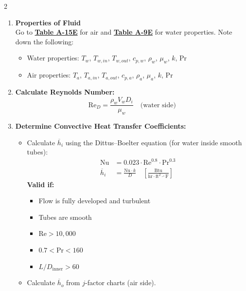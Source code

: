 \begin{multicols*}{2}
\begin{enumerate}
        \item \textbf{Properties of Fluid} \\
              Go to \underline{\textbf{Table A-15E}} for air and \underline{\textbf{Table A-9E}} for water properties. Note down the following:
              \begin{itemize}
                  \item Water properties: $T_w$, $T_{w,in}$, $T_{w,out}$, $c_{p,w}$, $\rho_w$, $\mu_w$, $k$, Pr
                  \item Air properties: $T_a$, $T_{a,in}$, $T_{a,out}$, $c_{p,a}$, $\rho_a$, $\mu_a$, $k$, Pr
              \end{itemize}
        \item \textbf{Calculate Reynolds Number:}
              \[
                  \text{Re}_D = \frac{\rho_w V_w D_i}{\mu_w} \quad \text{(water side)}
              \]
        \item \textbf{Determine Convective Heat Transfer Coefficients:}
              \begin{itemize}
                  \item Calculate $\overline{h}_i$ using the Dittus–Boelter equation (for water inside smooth tubes):
                        \begin{align*}
                            \text{Nu}      & = 0.023 \cdot \text{Re}^{0.8} \cdot \text{Pr}^{0.3}                                                                    \\
                            \overline{h}_i & = \frac{\text{Nu} \cdot k}{D} \quad \left[ \frac{\text{Btu}}{\text{hr} \cdot \text{ft}^2 \cdot ^\circ\text{F}} \right]
                        \end{align*}
                        \textbf{Valid if:}
                        \begin{itemize}
                            \item Flow is fully developed and turbulent
                            \item Tubes are smooth
                            \item $\text{Re} > 10{,}000$
                            \item $0.7 < \text{Pr} < 160$
                            \item $L/D_{\text{inner}} > 60$
                        \end{itemize}
                  \item Calculate $\overline{h}_o$ from $j$-factor charts (air side).

\end{itemize}
\end{enumerate}
\end{multicols*}
